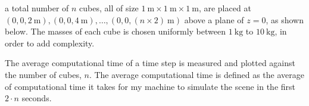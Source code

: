 a total number of $n$ cubes, all of size $\SI{1}{\m} \times \SI{1}{\m} \times \SI{1}{\m}$, 
are placed at $(0, 0, \SI{2}{\m}), (0, 0, \SI{4}{\m}), \ldots, (0, 0, (n \times 2)\SI{}{\m})$ above a plane of $z = 0$, 
as shown below.
The masses of each cube is chosen uniformly between $\SI{1}{\kg}$ to $\SI{10}{\kg}$, in order to add complexity.

\begin{center}
\end{center}

The average computational time of a time step is measured and plotted against the number of cubes, $n$.
The average computational time is defined as the average of computational time 
it takes for my machine to simulate the scene in the first $2\cdot n$ seconds.